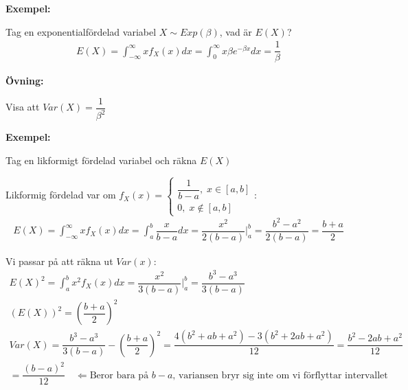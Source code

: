 \par\bigskip
\noindent\textbf{Exempel:}\par
\noindent Tag en exponentialfördelad variabel $X\sim Exp(\beta)$, vad är $E(X)$?
\begin{equation*}
  \begin{gathered}
    E(X) = \int_{-\infty}^{\infty}xf_X(x)dx = \int_{0}^{\infty}x\beta e^{-\beta x}dx = \dfrac{1}{\beta}
  \end{gathered}
\end{equation*}
\par\bigskip
\noindent\textbf{Övning:}\par
\noindent Visa att $Var(X) = \dfrac{1}{\beta^2}$
\par\bigskip
\noindent\textbf{Exempel:}\par
\noindent Tag en likformigt fördelad variabel och räkna $E(X)$\par
\noindent Likformig fördelad var om $f_X(x) = \begin{cases}\dfrac{1}{b-a},\; x\in[a,b]\\0,\;x\notin[a,b]\end{cases}$:
\begin{equation*}
  \begin{gathered}
    E(X) = \int_{-\infty}^{\infty}xf_X(x)dx = \int_{a}^{b}\dfrac{x}{b-a}dx = \dfrac{x^2}{2(b-a)}|_a^b = \dfrac{b^2-a^2}{2(b-a)} = \dfrac{b+a}{2}
  \end{gathered}
\end{equation*}
\par\bigskip
\noindent Vi passar på att räkna ut $Var(x):$
\begin{equation*}
  \begin{gathered}
    E(X)^2 = \int_{a}^{b}x^2f_X(x)dx = \dfrac{x^2}{3(b-a)}|_a^b = \dfrac{b^3-a^3}{3(b-a)}\\
    (E(X))^2 = \left(\dfrac{b+a}{2}\right)^2\\
    Var(X) = \dfrac{b^3-a^3}{3(b-a)} - \left(\dfrac{b+a}{2}\right)^2 = \dfrac{4(b^2+ab+a^2)-3(b^2+2ab+a^2)}{12} = \dfrac{b^2-2ab+a^2}{12}\\
    =\dfrac{(b-a)^2}{12}\quad\Leftarrow\text{Beror bara på $b-a$, variansen bryr sig inte om vi förflyttar intervallet}
  \end{gathered}
\end{equation*}
